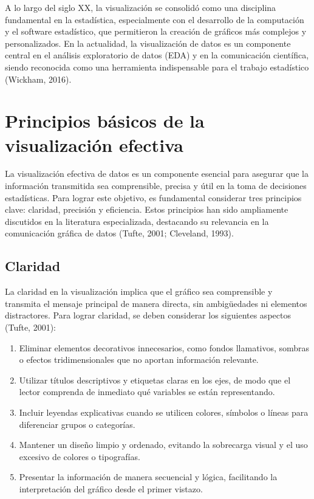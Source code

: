 \documentclass[
  spanish,
  a4paper,
  DIV=11,
  numbers=noendperiod,
  onepage,
  openany]{scrreprt}
\begin{document}
A lo largo del siglo XX, la visualización se consolidó como una
disciplina fundamental en la estadística, especialmente con el
desarrollo de la computación y el software estadístico, que permitieron
la creación de gráficos más complejos y personalizados. En la
actualidad, la visualización de datos es un componente central en el
análisis exploratorio de datos (EDA) y en la comunicación científica,
siendo reconocida como una herramienta indispensable para el trabajo
estadístico (Wickham, 2016).

\section{Principios básicos de la visualización
efectiva}\label{principios-buxe1sicos-de-la-visualizaciuxf3n-efectiva}

La visualización efectiva de datos es un componente esencial para
asegurar que la información transmitida sea comprensible, precisa y útil
en la toma de decisiones estadísticas. Para lograr este objetivo, es
fundamental considerar tres principios clave: claridad, precisión y
eficiencia. Estos principios han sido ampliamente discutidos en la
literatura especializada, destacando su relevancia en la comunicación
gráfica de datos (Tufte, 2001; Cleveland, 1993).

\subsection{Claridad}\label{claridad}

La claridad en la visualización implica que el gráfico sea comprensible
y transmita el mensaje principal de manera directa, sin ambigüedades ni
elementos distractores. Para lograr claridad, se deben considerar los
siguientes aspectos (Tufte, 2001):

\begin{enumerate}
\def\labelenumi{\arabic{enumi}.}
\item
  Eliminar elementos decorativos innecesarios, como fondos llamativos,
  sombras o efectos tridimensionales que no aportan información
  relevante.
\item
  Utilizar títulos descriptivos y etiquetas claras en los ejes, de modo
  que el lector comprenda de inmediato qué variables se están
  representando.
\item
  Incluir leyendas explicativas cuando se utilicen colores, símbolos o
  líneas para diferenciar grupos o categorías.
\item
  Mantener un diseño limpio y ordenado, evitando la sobrecarga visual y
  el uso excesivo de colores o tipografías.
\item
  Presentar la información de manera secuencial y lógica, facilitando la
  interpretación del gráfico desde el primer vistazo.
\end{enumerate}
\end{document}

